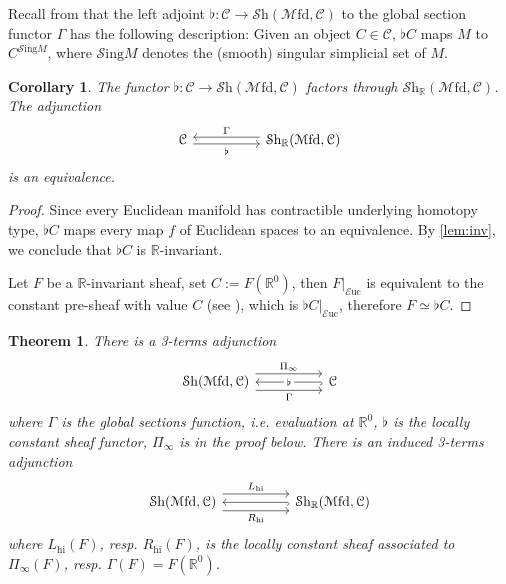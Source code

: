 \documentclass[a4paper]{book}
\newcommand{\lC}{\mathcal{C}}
\newcommand{\lE}{\mathcal{E}}
\newcommand{\lM}{\mathcal{M}}
\newcommand{\bR}{\mathbb{R}}
\newcommand{\lS}{\mathcal{S}}
\newcommand{\Shv}{\lS\mathrm{h}} %
\newcommand{\hi}{\mathrm{hi}}
\newcommand{\Sing}{\lS\mathrm{ing}} %
\newcommand{\Euc}{\lE\mathrm{uc}} %
\newcommand{\Mfd}{\lM\mathrm{fd}} %
\newtheorem{theorem}[equation]{Theorem}
\newtheorem{corollary}[equation]{Corollary}
\theoremstyle{definition}
\theoremstyle{remark}
\numberwithin{equation}{section}
\begin{document}
Recall from \cite{nanto2025diffcoh4} that the left adjoint $\flat:\lC\to\Shv(\Mfd,\lC)$ to the global section functor $\Gamma$ has the following description: Given an object $C\in\lC$, $\flat C$ maps $M$ to $C^{\Sing M}$, where $\Sing M$ denotes the (smooth) singular simplicial set of $M$.
\begin{corollary}\label{cor:equiv}
  The functor $\flat:\lC\to\Shv(\Mfd,\lC)$ factors through $\Shv_\bR(\Mfd,\lC)$. The adjunction \begin{equation}
    \begin{tikzcd}
      \lC \arrow[rr,shift right,"\flat"'] & & \Shv_\bR(\Mfd,\lC) \arrow[ll,shift right,"\Gamma"']
    \end{tikzcd}
  \end{equation}is an equivalence. 
\end{corollary}
\begin{proof}
  Since every Euclidean manifold has contractible underlying homotopy type, $\flat C$ maps every map $f$ of Euclidean spaces to an equivalence. By \cref{lem:inv}, we conclude that $\flat C$ is $\bR$-invariant. 

  Let $F$ be a $\bR$-invariant sheaf, set $C:=F(\bR^0)$, then $F|_{\Euc}$ is equivalent to the constant pre-sheaf with value $C$ (see \cite[Remark 2.7]{nanto2025diffcoh4}), which is $\flat C|_{\Euc}$, therefore $F\simeq \flat C$.
\end{proof}
\begin{theorem}\label{thm:adj}
  There is a 3-terms adjunction 
  \begin{equation}\label{eq:adjunction}
    \begin{tikzcd}
      \Shv(\Mfd,\lC) \arrow[rr,shift left=2.5,"\Pi_\infty"] \arrow[rr,shift right=2.5,"\Gamma"'] & & \lC \arrow[ll,hook,"\flat" description]
    \end{tikzcd}
  \end{equation}
  where $\Gamma$ is the global sections function, i.e. evaluation at $\bR^0$, $\flat$ is the locally constant sheaf functor, $\Pi_\infty$ is in the proof below. There is an induced 3-terms adjunction \begin{equation}
    \begin{tikzcd}
      \Shv(\Mfd,\lC) \arrow[rr,shift left=2.5,"L_\hi"] \arrow[rr,shift right=2.5,"R_\hi"'] & & \Shv_\bR(\Mfd,\lC) \arrow[ll,hook]
    \end{tikzcd}
  \end{equation}where $L_\hi(F)$, resp. $R_\hi(F)$, is the locally constant sheaf associated to $\Pi_\infty(F)$, resp. $\Gamma(F)=F(\bR^0)$. 
\end{theorem}
\end{document}
